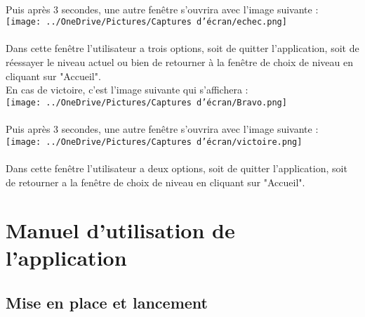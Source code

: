 \documentclass{article}
\begin{document}
\\
Puis après 3 secondes, une autre fenêtre s'ouvrira avec l'image suivante : \\
\texttt{[image: ../OneDrive/Pictures/Captures d’écran/echec.png]} 
\\
\\
Dans cette fenêtre l'utilisateur a trois options, soit de quitter l'application, soit de réessayer le niveau actuel ou bien de retourner à la fenêtre de choix de niveau en cliquant sur "Accueil".\\
En cas de victoire, c'est l'image suivante qui s'affichera :\\
\texttt{[image: ../OneDrive/Pictures/Captures d’écran/Bravo.png]} 
\\
\\
Puis après 3 secondes, une autre fenêtre s'ouvrira avec l'image suivante : \\
\texttt{[image: ../OneDrive/Pictures/Captures d’écran/victoire.png]}
\\
\\
Dans cette fenêtre l'utilisateur a deux options, soit de quitter l'application, soit de retourner a la fenêtre de choix de niveau en cliquant sur "Accueil". 

\section{Manuel d'utilisation de l'application}
\subsection{Mise en place et lancement}
\end{document}
